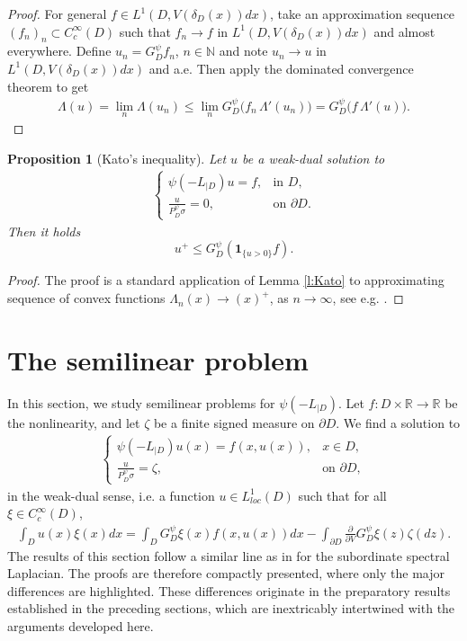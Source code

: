 \documentclass[12pt,a4paper,onecolumn]{article}
\newtheorem{prop}[thm]{Proposition}
\theoremstyle{definition}
\newcommand{\R}{\mathbb{R}}
\newcommand{\N}{\mathbb{N}}
\newcommand{\1}{\mathbf 1}
\newcommand{\de}{\delta_D}
\newcommand{\LLL}{L^1(D,V(\de(x))dx)}
\newcommand{\Lo}{\psi(-L_{|D})}
\newcommand{\GDP}{G_D^\psi}
\newcommand{\PDS}{P^{\psi}_{ D}}
\numberwithin{equation}{section}
\begin{document}
\begin{proof}
     For general $f\in \LLL$, take an approximation sequence $(f_n)_n\subset C_c^\infty(D)$ such that $f_n\to f$ in $\LLL$ and almost everywhere. Define $u_n=\GDP f_n$, $n\in \N$ and note $u_n\to u$ in $\LLL$ and a.e. Then apply the dominated convergence theorem to get
     \begin{align*}
     	\Lambda(u)=\lim_n\Lambda(u_n)\le \lim_n \GDP\big(f_n\, \Lambda'(u_n)\big)= \GDP\big(f\, \Lambda'(u)\big).
     \end{align*}
 \end{proof}
 
 \begin{prop}[Kato's inequality]
     Let $u$ be a weak-dual solution to 
     \begin{align*}
         \begin{cases}
         \Lo u=f,& \text{in $D$,}\\
         \frac{u}{\PDS\sigma}=0,&\text{on $\partial D$}.
    \end{cases}
     \end{align*}
     Then it holds
     $$u^+\le \GDP\left(\1_{\{u> 0\}}f\right).$$
 \end{prop}
 \begin{proof}
     The proof is a standard application of Lemma \ref{l:Kato} to approximating sequence of convex functions $\Lambda_n(x) \to (x)^+$, as 
$n\to \infty$, see e.g. \cite[Proposition 5.4]{Bio23cpaa}.
\end{proof}

\section{The semilinear problem}\label{s:semilinear}
In this section, we study semilinear problems for $\Lo$. Let $f:D\times \R\to \R$ be the nonlinearity, and let $\zeta$ be a finite signed measure on $\partial D$. We  find a solution to
\begin{align}\label{eq:semilinear}
	\begin{cases}
		\Lo u(x)=f(x,u(x)),& x\in D,\\
		\frac{u}{\PDS\sigma}=\zeta,&\text{on $\partial D$},
	\end{cases}
\end{align}
in the weak-dual sense, i.e. a function $u\in L^1_{loc}(D)$ such that for all $\xi\in C_c^\infty(D)$,
\begin{align*}
	\int_D u(x)\xi(x)dx=\int_D\GDP\xi(x)f(x,u(x))dx-\int_{\partial D}\frac{\partial}{\partial V}\GDP\xi(z)\zeta(dz).
\end{align*}
The results of this section follow a similar line as in \cite{Bio23cpaa} for the subordinate spectral Laplacian. The proofs are therefore compactly presented, where only the major differences are highlighted. These differences originate in the preparatory results established in the preceding sections, which are inextricably intertwined with the arguments developed here.
\end{document}

